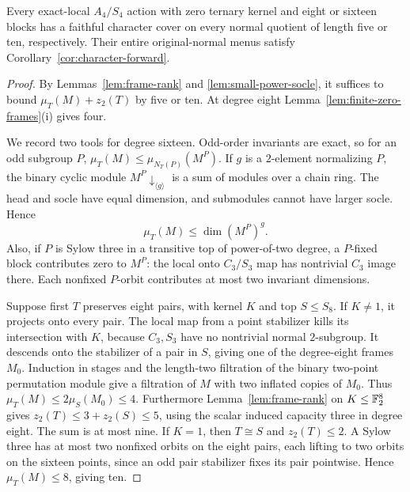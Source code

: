 \begin{theorem}
\label{thm:zero-ternary-small-frames}
Every exact-local $A_4/S_4$ action with zero ternary kernel and
eight or sixteen blocks has a faithful character cover on every
normal quotient of length five or ten, respectively. Their entire
original-normal menus satisfy Corollary~\ref{cor:character-forward}.
\end{theorem}
\begin{proof}
By Lemmas~\ref{lem:frame-rank} and \ref{lem:small-power-socle},
it suffices to bound $\mu_T(M)+z_2(T)$ by five or ten.
At degree eight Lemma~\ref{lem:finite-zero-frames}(i) gives four.

We record two tools for degree sixteen. Odd-order invariants are
exact, so for an odd subgroup $P$,
$\mu_T(M)\leq\mu_{N_T(P)}(M^P)$. If $g$ is a $2$-element
normalizing $P$, the binary cyclic module $M^P\downarrow_{\langle g\rangle}$
is a sum of modules over a chain ring. The head and socle have
equal dimension, and submodules cannot have larger socle. Hence
\[
 \mu_T(M)\leq\dim(M^P)^g.
\]
Also, if $P$ is Sylow three in a transitive top of power-of-two
degree, a $P$-fixed block contributes zero to $M^P$: the local
onto $C_3/S_3$ map has nontrivial $C_3$ image there. Each nonfixed
$P$-orbit contributes at most two invariant dimensions.

Suppose first $T$ preserves eight pairs, with kernel $K$ and top
$S\leq S_8$. If $K\ne1$, it projects onto every pair. The
local map from a point stabilizer kills its intersection with $K$,
because $C_3,S_3$ have no nontrivial normal $2$-subgroup. It
descends onto the stabilizer of a pair in $S$, giving one of the
degree-eight frames $M_0$. Induction in stages and the length-two
filtration of the binary two-point permutation module give a
filtration of $M$ with two inflated copies of $M_0$. Thus
$\mu_T(M)\leq2\mu_S(M_0)\leq4$.
Furthermore Lemma~\ref{lem:frame-rank} on $K\leq\mathbb F_2^8$ gives
$z_2(T)\leq3+z_2(S)\leq5$, using the scalar induced capacity
three in degree eight. The sum is at most nine.
If $K=1$, then $T\cong S$ and $z_2(T)\leq2$. A Sylow three
has at most two nonfixed orbits on the eight pairs, each lifting
to two orbits on the sixteen points, since an odd pair stabilizer
fixes its pair pointwise. Hence $\mu_T(M)\leq8$, giving ten.


\end{proof}
